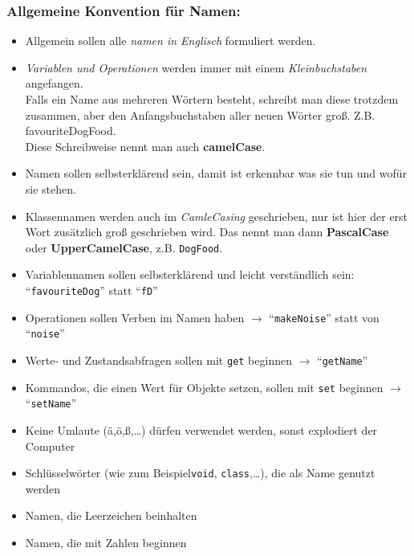 \subsubsection*{Allgemeine Konvention für Namen:}
\begin{itemize}
	\item Allgemein sollen alle \textit{namen in Englisch} formuliert werden.
	\item \textit{Variablen und Operationen} werden immer mit einem \textit{Kleinbuchstaben} angefangen.\\
	Falls ein Name aus mehreren Wörtern besteht, schreibt man diese trotzdem zusammen, aber den Anfangsbuchstaben aller neuen Wörter groß. Z.B. favouriteDogFood.\\
	Diese Schreibweise nennt man auch \textbf{camelCase}.
	\item Namen sollen selbsterklärend sein, damit ist erkennbar was sie tun und wofür sie stehen.
	\item Klassennamen werden auch im \textit{CamleCasing} geschrieben, nur ist hier der erst Wort zusätzlich groß geschrieben wird.
	Das nennt man dann \textbf{PascalCase} oder \textbf{UpperCamelCase}, z.B. \lstinline{DogFood}.
\end{itemize}

\begin{Infobox}[Stilregeln:]
	\begin{itemize}
		\item Variablennamen sollen selbsterklärend und leicht verständlich sein: \enquote{\lstinline{favouriteDog}} statt \enquote{\lstinline{fD}}
		\item Operationen sollen Verben im Namen haben $\rightarrow$ \enquote{\lstinline{makeNoise}} statt von \enquote{\lstinline{noise}}
		\item Werte- und Zustandsabfragen sollen mit \lstinline{get} beginnen $\rightarrow$ \enquote{\lstinline{getName}}
		\item Kommandos, die einen Wert für Objekte setzen, sollen mit \lstinline{set} beginnen $\rightarrow$ \enquote{\lstinline{setName}}
		\item Keine Umlaute (ä,ö,ß,\dots) dürfen verwendet werden, sonst explodiert der Computer

	\end{itemize}
\end{Infobox}
\vspace{5mm}
\begin{Infobox}
	\begin{itemize}
		\item Schlüsselwörter (wie zum Beispiel\lstinline{void}, \lstinline{class},\dots), die als Name genutzt werden
		\item Namen, die Leerzeichen beinhalten
		\item Namen, die mit Zahlen beginnen
	\end{itemize}
\end{Infobox}

